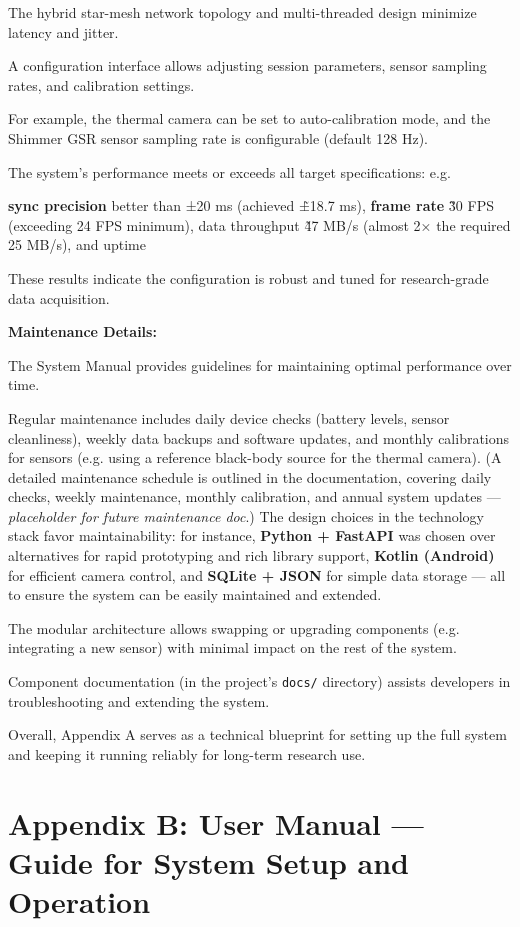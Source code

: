 The hybrid star-mesh network topology and multi-threaded design minimize latency and
jitter.

A configuration interface allows adjusting session parameters, sensor sampling rates,
and calibration settings.

For example, the thermal camera can be set to auto-calibration mode, and the Shimmer
GSR sensor sampling rate is configurable (default 128 Hz).

The system's performance meets or exceeds all target specifications: e.g.

\textbf{sync precision}
 better than ±20 ms (achieved \~±18.7 ms), \textbf{frame rate}
 \~30 FPS (exceeding 24 FPS minimum), data throughput \~47 MB/s (almost 2× the
 required 25 MB/s), and uptime %

These results indicate the configuration is robust and tuned for research-grade data
acquisition.

\textbf{Maintenance Details:}

The System Manual provides guidelines for maintaining optimal performance over time.

Regular maintenance includes daily device checks (battery levels, sensor
cleanliness), weekly data backups and software updates, and monthly calibrations for
sensors (e.g.  using a reference black-body source for the thermal camera).  (A
detailed maintenance schedule is outlined in the documentation, covering daily
checks, weekly maintenance, monthly calibration, and annual system updates ---
\textit{placeholder for future maintenance doc}.) The design choices in the
technology stack favor maintainability: for instance, \textbf{Python + FastAPI}
 was chosen over alternatives for rapid prototyping and rich library support,
 \textbf{Kotlin (Android)}
 for efficient camera control, and \textbf{SQLite + JSON}
 for simple data storage --- all to ensure the system can be easily maintained and
 extended.

The modular architecture allows swapping or upgrading components (e.g.  integrating a
new sensor) with minimal impact on the rest of the system.

Component documentation (in the project's \texttt{docs/} directory) assists
developers in troubleshooting and extending the system.

Overall, Appendix A serves as a technical blueprint for setting up the full system
and keeping it running reliably for long-term research use.

\section{Appendix B: User Manual --- Guide for System Setup and Operation}

